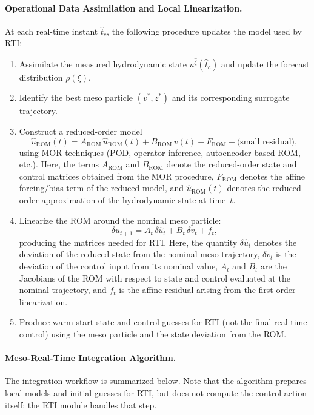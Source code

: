 \documentclass{article}
\newcommand{\1}{\mathds{1}}          %
\theoremstyle{definition}
\begin{document}
\begin{sloppypar}
\paragraph{Operational Data Assimilation and Local Linearization.}
At each real-time instant $\hat{t}_c$, the following procedure updates the model used by RTI:
\begin{enumerate}
    \item Assimilate the measured hydrodynamic state $u^{\hat{\xi}}(\hat{t}_c)$ and update 
          the forecast distribution $\tilde{\rho}(\xi)$.
    \item Identify the best meso particle $(v^{*},z^{*})$ and its corresponding surrogate 
          trajectory.
    \item Construct a reduced-order model 
          \[
             \hat{u}_{\mathrm{ROM}}(t) = A_{\mathrm{ROM}}\,\hat{u}_{\mathrm{ROM}}(t)
             + B_{\mathrm{ROM}}\,v(t) + F_{\mathrm{ROM}} + \text{(small residual)},
          \]
          using MOR techniques (POD, operator inference, autoencoder-based ROM, etc.). Here, the terms $A_{\mathrm{ROM}}$ and $B_{\mathrm{ROM}}$ denote the reduced-order state and control matrices obtained from the MOR procedure, $F_{\mathrm{ROM}}$ denotes the affine forcing/bias term of the reduced model, and $\hat{u}_{\mathrm{ROM}}(t)$ denotes the reduced-order approximation of the hydrodynamic state at time~$t$.
    \item Linearize the ROM around the nominal meso particle:
          \[
             \delta \hat{u}_{t+1}
             = A_t\,\delta \hat{u}_t
             + B_t\,\delta v_t
             + f_t,
          \]
          producing the matrices needed for RTI. Here, the quantity $\delta\hat{u}_t$ denotes the deviation of the reduced state from the nominal meso trajectory, $\delta v_t$ is the deviation of the control input from its nominal value, $A_t$ and $B_t$ are the Jacobians of the ROM with respect to state and control evaluated at the nominal trajectory, and $f_t$ is the affine residual arising from the first-order linearization.
    \item Produce warm-start state and control guesses for RTI (not the final real-time control) using the meso particle and the state deviation 
          from the ROM.
\end{enumerate}

\paragraph{Meso-Real-Time Integration Algorithm.} The integration workflow is summarized below. Note that the algorithm prepares local models and initial guesses for RTI, but does not compute the control action itself; the RTI module handles that step.


\end{sloppypar}
\end{document}
